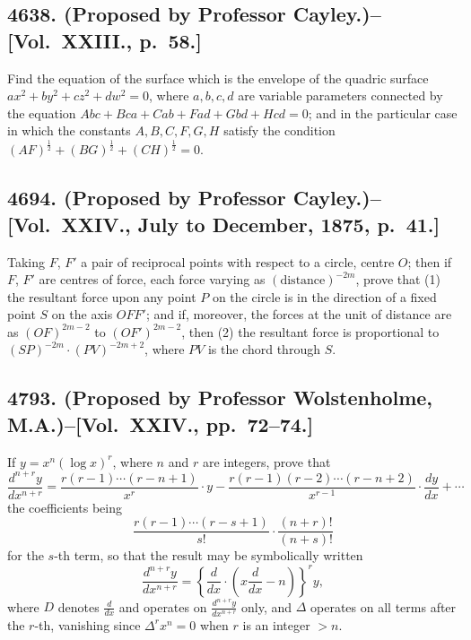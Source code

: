 \documentclass[11pt,a4paper]{article}
\theoremstyle{definition}
\begin{document}
\newpage

\subsection*{4638. (Proposed by Professor Cayley.)\---[Vol.~XXIII., p.~58.]}

Find the equation of the surface which is the envelope of the quadric surface $ax^2+by^2+cz^2+dw^2=0$, where $a,b,c,d$ are variable parameters connected by the equation $Abc+Bca+Cab+Fad+Gbd+Hcd=0$; and in the particular case in which the constants $A,B,C,F,G,H$ satisfy the condition $(AF)^{\frac{1}{2}}+(BG)^{\frac{1}{2}}+(CH)^{\frac{1}{2}}=0$.

\subsection*{4694. (Proposed by Professor Cayley.)\---[Vol.~XXIV., July to December, 1875, p.~41.]}

Taking $F$, $F'$ a pair of reciprocal points with respect to a circle, centre $O$; then if $F$, $F'$ are centres of force, each force varying as $(\text{distance})^{-2m}$, prove that (1) the resultant force upon any point $P$ on the circle is in the direction of a fixed point $S$ on the axis $OFF'$; and if, moreover, the forces at the unit of distance are as $(OF)^{2m-2}$ to $(OF')^{2m-2}$, then (2) the resultant force is proportional to $(SP)^{-2m} \cdot (PV)^{-2m+2}$, where $PV$ is the chord through $S$.

\newpage

\subsection*{4793. (Proposed by Professor Wolstenholme, M.A.)\---[Vol.~XXIV., pp.~72--74.]}

If $y = x^n (\log x)^r$, where $n$ and $r$ are integers, prove that
\[
\frac{d^{n+r}y}{dx^{n+r}} = \frac{r(r-1)\cdots(r-n+1)}{x^r} \cdot y
- \frac{r(r-1)(r-2)\cdots(r-n+2)}{x^{r-1}} \cdot \frac{dy}{dx}
+ \cdots
\]
the coefficients being
\[
\frac{r(r-1)\cdots(r-s+1)}{s!} \cdot \frac{(n+r)!}{(n+s)!}
\]
for the $s$-th term, so that the result may be symbolically written
\[
\frac{d^{n+r}y}{dx^{n+r}} = \left\{ \frac{d}{dx} \cdot \left( x\frac{d}{dx} - n \right) \right\}^r y,
\]
where $D$ denotes $\frac{d}{dx}$ and operates on $\frac{d^{n+r}y}{dx^{n+r}}$ only, and $\Delta$ operates on all terms after the $r$-th, vanishing since $\Delta^r x^n = 0$ when $r$ is an integer $>n$.
\end{document}

